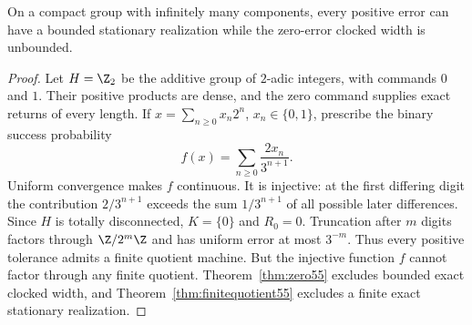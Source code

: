 \begin{proposition}\label{prop:adic55}
On a compact group with infinitely many components, every positive error can have a bounded stationary realization while the zero-error clocked width is unbounded.
\end{proposition}
\begin{proof}
Let $H=\Z_2$ be the additive group of $2$-adic integers, with commands $0$ and $1$. Their positive products are dense, and the zero command supplies exact returns of every length. If $x=\sum_{n\ge0}x_n2^n$, $x_n\in\{0,1\}$, prescribe the binary success probability
\[
                         f(x)=\sum_{n\ge0}\frac{2x_n}{3^{n+1}}.
\]
Uniform convergence makes $f$ continuous. It is injective: at the first differing digit the contribution $2/3^{n+1}$ exceeds the sum $1/3^{n+1}$ of all possible later differences. Since $H$ is totally disconnected, $K=\{0\}$ and $R_0=0$. Truncation after $m$ digits factors through $\Z/2^m\Z$ and has uniform error at most $3^{-m}$. Thus every positive tolerance admits a finite quotient machine. But the injective function $f$ cannot factor through any finite quotient. Theorem~\ref{thm:zero55} excludes bounded exact clocked width, and Theorem~\ref{thm:finitequotient55} excludes a finite exact stationary realization.
\end{proof}

